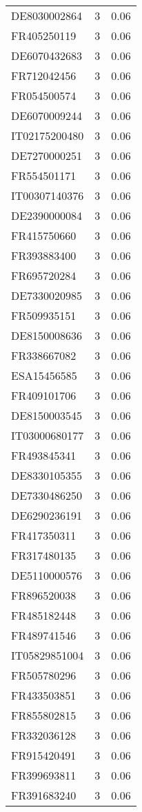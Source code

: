 \begin{table*}[htbp]
\begin{tabular}{lrr}
DE8030002864 & 3 & 0.06 \\
FR405250119 & 3 & 0.06 \\
DE6070432683 & 3 & 0.06 \\
FR712042456 & 3 & 0.06 \\
FR054500574 & 3 & 0.06 \\
DE6070009244 & 3 & 0.06 \\
IT02175200480 & 3 & 0.06 \\
DE7270000251 & 3 & 0.06 \\
FR554501171 & 3 & 0.06 \\
IT00307140376 & 3 & 0.06 \\
DE2390000084 & 3 & 0.06 \\
FR415750660 & 3 & 0.06 \\
FR393883400 & 3 & 0.06 \\
FR695720284 & 3 & 0.06 \\
DE7330020985 & 3 & 0.06 \\
FR509935151 & 3 & 0.06 \\
DE8150008636 & 3 & 0.06 \\
FR338667082 & 3 & 0.06 \\
ESA15456585 & 3 & 0.06 \\
FR409101706 & 3 & 0.06 \\
DE8150003545 & 3 & 0.06 \\
IT03000680177 & 3 & 0.06 \\
FR493845341 & 3 & 0.06 \\
DE8330105355 & 3 & 0.06 \\
DE7330486250 & 3 & 0.06 \\
DE6290236191 & 3 & 0.06 \\
FR417350311 & 3 & 0.06 \\
FR317480135 & 3 & 0.06 \\
DE5110000576 & 3 & 0.06 \\
FR896520038 & 3 & 0.06 \\
FR485182448 & 3 & 0.06 \\
FR489741546 & 3 & 0.06 \\
IT05829851004 & 3 & 0.06 \\
FR505780296 & 3 & 0.06 \\
FR433503851 & 3 & 0.06 \\
FR855802815 & 3 & 0.06 \\
FR332036128 & 3 & 0.06 \\
FR915420491 & 3 & 0.06 \\
FR399693811 & 3 & 0.06 \\
FR391683240 & 3 & 0.06 \\

\end{tabular}
\end{table*}
